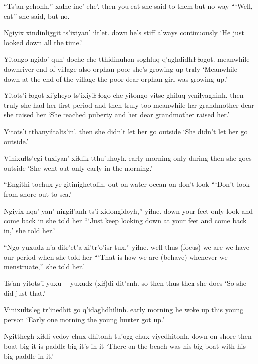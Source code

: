 \documentclass[12pt]{article}
\begin{document}
\gll ``Ts'an gehonh,'' xaɬne ine' ehe'. 
then  {you eat} {she said to them} but {no way}
\glt ```Well, eat'' she said, but no.
\glend

\gll  Ngiyix xindinliggit ts'ixiyan' iɬt'et. 
down {he's stiff} always continuously
\glt  `He just looked down all the time.' 
\glend

\gll Yitongo ngido' {qun' doche} che  tthidinuhon soghluq q'aghdidhiɬ ɬogot. 
meanwhile downriver {end of village} also orphan poor {she's growing up} truly
\glt `Meanwhile down at the end of the village the poor dear orphan girl was growing up.' 
\glend

\gll Yitots'i ɬogot xi'gheyo ts'ixiyiɬ ɬogo che yitongo vitse ghiluq yeniɬyaghinh. 
then       truly {she had her first period} {and then} truly too meanwhile {her grandmother} dear {she raised her}
\glt `She reached puberty and her dear grandmother raised her.' 
\glend

\gll Yitots'i {tthanyiɬtalts'in'.}
then       {she didn't let her go outside}
\glt `She didn't let her go outside.' 
\glend

\gll Vinixuɬts'egi tuxiyan' xiɬdik tthu'uhoyh. 
{early morning} {only during} then {she goes outside}
\glt `She went out only early in the morning.' 
\glend

\gll ``Engithi tochux ye gitinighetolin. 
{out on water} ocean on {don't look}
\glt ```Don't look from shore out to sea.' 
\glend

\gll Ngiyix nqa' yan' ningiɬ'anh ts'i xidongidoyh,'' yiɬne. 
down   {your feet} only look and {come back in} {she told her}
\glt ```Just keep looking down at your feet and come back in,' she told her.' 
\glend

\gll ``Ngo yuxudz n'a ditr'et'a xi'tr'o'isr tux,'' yiɬne.
well thus (focus) {we are} {we have our period} when {she told her}
\glt ```That is how we are (behave) whenever we menstruate,'' she told her.' 
\glend

\gll Ts'an yitots'i yuxu--- yuxudz (xiɬ)di dit'anh. 
so     then {} thus then {she does}
\glt `So she did just that.' 
\glend

\gll Vinixuɬts'eg tr'inedhit go q'idaghdhilinh. 
{early morning} {he woke up} this {young person} 
\glt `Early one morning the young hunter got up.' 
\glend

\gll Ngitthegh xiɬdi vedoy chux dhitonh tu'ogg chux viyedhitonh. 
{down on shore}      then   boat big {it is} paddle big {it's in it}
\glt `There on the beach was his big boat with his big paddle in it.' 
\glend
\end{document}

